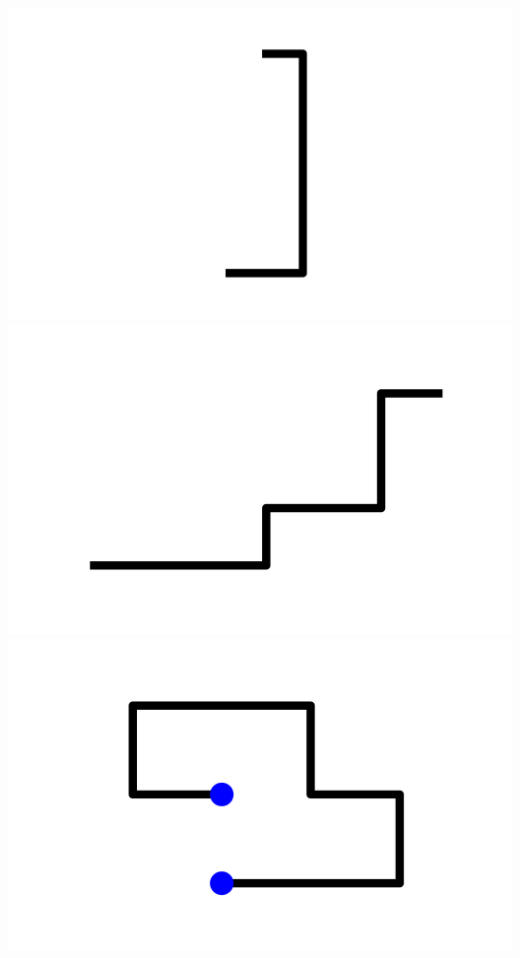 \documentclass[]{report}
\begin{document}
\includegraphics[scale=.1]{pictures/21/state_cluster_shapes_229.pdf} 
\includegraphics[scale=.1]{pictures/21/state_cluster_shapes_230.pdf} 
\includegraphics[scale=.1]{pictures/21/state_cluster_shapes_231.pdf} 
\end{document}
